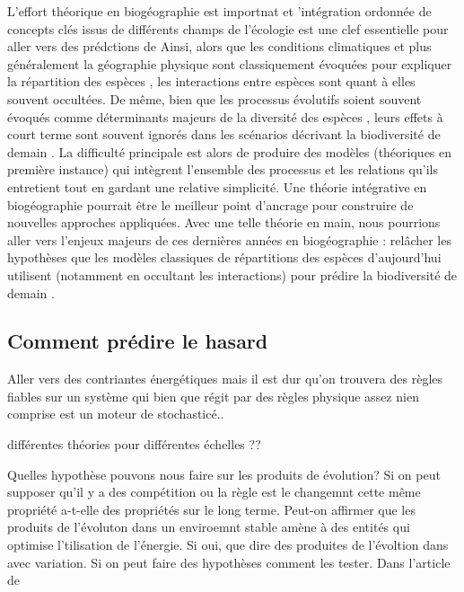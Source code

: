 L'effort théorique en biogéographie est importnat et 'intégration
ordonnée de concepts clés issus de différents champs de l'écologie
\cite{Thuiller2013} est une clef essentielle pour aller vers des
prédctions de Ainsi, alors que les conditions climatiques et plus
généralement la géographie physique sont classiquement évoquées pour
expliquer la répartition des espèces \cite{Kearney2004}, les
interactions entre espèces sont quant à elles souvent occultées. De
même, bien que les processus évolutifs soient souvent évoqués comme
déterminants majeurs de la diversité des espèces \cite{Rosindell2011},
leurs effets à court terme sont souvent ignorés \cite{Parmesan2006} dans
les scénarios décrivant la biodiversité de demain \cite{Lavergne2010}.
La difficulté principale est alors de produire des modèles (théoriques
en première instance) qui intègrent l'ensemble des processus et les
relations qu'ils entretient \cite{Thuiller2013} tout en gardant une
relative simplicité. Une théorie intégrative en biogéographie pourrait
être le meilleur point d'ancrage pour construire de nouvelles approches
appliquées. Avec une telle théorie en main, nous pourrions aller vers
l'enjeux majeurs de ces dernières années en biogéographie : relâcher les
hypothèses que les modèles classiques de répartitions des espèces
d'aujourd'hui utilisent (notamment en occultant les interactions) pour
prédire la biodiversité de demain \cite{Guisan2011}.

\subsection*{Comment prédire le
hasard}\label{comment-pruxe9dire-le-hasard}

Aller vers des contriantes énergétiques mais il est dur qu'on trouvera
des règles fiables sur un système qui bien que régit par des règles
physique assez nien comprise est un moteur de stochasticé..

différentes théories pour différentes échelles ??

Quelles hypothèse pouvons nous faire sur les produits de évolution? Si
on peut supposer qu'il y a des compétition ou la règle est le changemnt
cette même propriété a-t-elle des propriétés sur le long terme. Peut-on
affirmer que les produits de l'évoluton dans un enviroemnt stable amène
à des entités qui optimise l'tilisation de l'énergie. Si oui, que dire
des produites de l'évoltion dans avec variation. Si on peut faire des
hypothèses comment les tester. Dans l'article de

